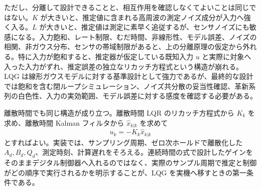 ただし、分離して設計できることと、相互作用を確認しなくてよいことは同じではない。$K$ が大きいと、推定値に含まれる高周波の測定ノイズ成分が入力へ強く入る。$L$ が大きいと、推定値は測定に素早く追従するが、センサノイズにも敏感になる。入力飽和、レート制限、むだ時間、非線形性、モデル誤差、ノイズの相関、非ガウス分布、センサの帯域制限があると、上の分離原理の仮定から外れる。特に入力が飽和すると、推定器が仮定している既知入力 $u$ と実際に対象へ入った入力がずれ、推定誤差の独立なリカッチ方程式という構造が崩れる。LQG は線形ガウスモデルに対する基準設計として強力であるが、最終的な設計では飽和を含む閉ループシミュレーション、ノイズ共分散の妥当性確認、革新系列の白色性、入力の実効範囲、モデル誤差に対する感度を確認する必要がある。

離散時間でも同じ構造が成り立つ。離散時間 LQR のリカッチ方程式から $K_k$ を求め、離散時間 Kalman フィルタから $\hat{x}_{k|k}$ を求めて
\begin{equation}
  u_k=-K_k\hat{x}_{k|k}
\end{equation}
とすればよい。実装では、サンプリング周期、ゼロ次ホールドで離散化した $A_d,B_d,Q_d$、測定時刻、計算遅れをそろえる。連続時間の式で設計したゲインをそのままデジタル制御器へ入れるのではなく、実際のサンプル周期で推定と制御がどの順序で実行されるかを明示することが、LQG を実機へ移すときの第一条件である。

